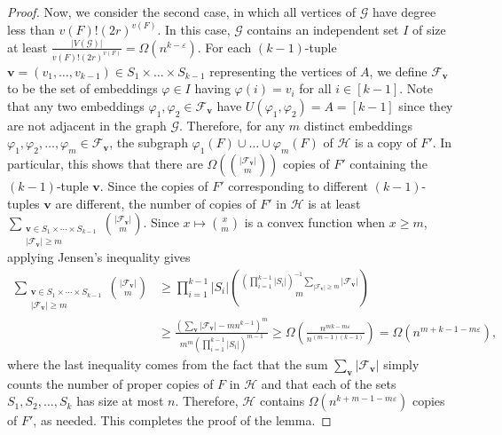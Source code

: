 \documentclass{daj}
\def\eps{\varepsilon}
\def\cF{\mathcal{F}}
\def\cG{\mathcal{G}}
\def\cH{\mathcal{H}}
\theoremstyle{plain}
\theoremstyle{remark}
\begin{document}
\begin{proof}
Now, we consider the second case, in which all vertices of $\cG$ have degree less than $v(F)!(2r)^{v(F)}$. In this case, $\cG$ contains an independent set $I$ of size at least $\frac{|V(\cG)|}{v(F)!(2r)^{v(F)}}=\Omega(n^{k-\eps})$. For each $(k-1)$-tuple $\mathbf{v}=(v_1, \dots, v_{k-1})\in S_1\times\dots\times S_{k-1}$ representing the vertices of $A$, we define $\cF_{\mathbf{v}}$ to be the set of embeddings $\varphi\in I$ having $\varphi(i)=v_i$ for all $i\in [k-1]$. Note that any two embeddings $\varphi_1, \varphi_2\in \cF_{\mathbf{v}}$ have $U(\varphi_1, \varphi_2)=A=[k-1]$ since they are not adjacent in the graph $\cG$. Therefore, for any $m$ distinct embeddings $\varphi_1, \varphi_2, \ldots, \varphi_m \in \cF_{\mathbf{v}}$, the subgraph $\varphi_1(F)\cup \ldots \cup \varphi_m(F)$ of $\cH$ is a copy of $F'$. In particular, this shows that there are $\Omega\left(\binom{|\cF_{\mathbf{v}}|}{m}\right)$ copies of $F'$ containing the $(k-1)$-tuple $\mathbf{v}$. Since the copies of $F'$ corresponding to different $(k-1)$-tuples $\mathbf{v}$ are different, the number of copies of $F'$ in $\cH$ is at least $\sum_{\substack{\mathbf{v}\in S_1\times\cdots\times S_{k-1}\\|\cF_{\mathbf{v}}|\geq m}} \binom{|\cF_{\mathbf{v}}|}{m}$. Since $x\mapsto \binom{x}{m}$ is a convex function when $x\geq m$, applying Jensen's inequality gives
\begin{align*}
    \sum_{\substack{\mathbf{v}\in S_1\times\cdots\times S_{k-1}\\|\cF_{\mathbf{v}}|\geq m}} \binom{|\cF_{\mathbf{v}}|}{m}&\geq \prod_{i=1}^{k-1}|S_i|\binom{(\prod_{i=1}^{k-1}|S_i|)^{-1}\sum_{|\cF_{\mathbf{v}}|\geq m} |\cF_{\mathbf{v}}|}{m} \\&\geq \frac{\left(\sum_{\mathbf{v}} |\cF_{\mathbf{v}}|-mn^{k-1}\right)^m}{m^m (\prod_{i=1}^{k-1}|S_i|)^{m-1}}
    \geq \Omega\left(\frac{n^{mk-m\eps}}{n^{(m-1)(k-1)}}\right)= \Omega\left(n^{m+k-1-m\eps}\right),
\end{align*}
where the last inequality comes from the fact that the sum $\sum_{\mathbf{v}} |\cF_{\mathbf{v}}|$ simply counts the number of proper copies of $F$ in $\cH$ and that each of the sets $S_1, S_2, \ldots, S_k$ has size at most $n$. Therefore, $\cH$ contains $\Omega(n^{k+m-1-m\eps})$ copies of $F'$, as needed. This completes the proof of the lemma.
\end{proof}
\end{document}
